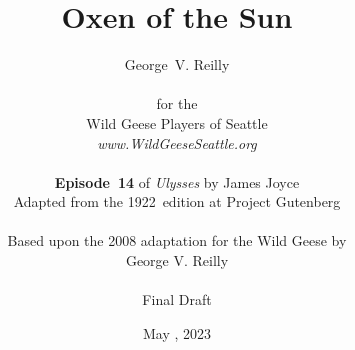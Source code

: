 


\title{\Huge Oxen of the Sun}
\author{George~V. Reilly\\
\\
{\small for the}\\
Wild Geese Players of Seattle\\
{\textit{www.WildGeeseSeattle.org}}\\
\\
{\small \textbf{Episode~14} of \textit{Ulysses} by James Joyce}\\
{\small Adapted from the 1922~edition at Project Gutenberg}
\\
\\
{\small Based upon the 2008 adaptation for the Wild Geese by}\\
{\small George V. Reilly}
\\
\\
{\small Final Draft}}
\date{May , 2023}
\raggedbottom



\maketitle

